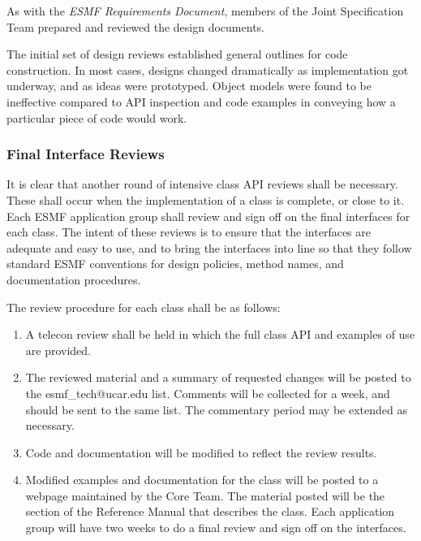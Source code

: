 As with the {\it ESMF Requirements Document}, members of the Joint 
Specification Team prepared and reviewed the design documents. 

The initial set of design reviews established general outlines for 
code construction.  In most cases, designs changed dramatically as
implementation got underway, and as ideas were prototyped.  Object 
models were found to be ineffective compared to API inspection and 
code examples in conveying how a particular piece of code would work.

\subsubsection{Final Interface Reviews}

It is clear that another round of intensive class API reviews
shall be necessary.  These shall occur when the implementation 
of a class is complete, or close to it.  Each ESMF application group 
shall review 
and sign off on the final interfaces for each class.  The intent 
of these reviews is to ensure that the interfaces are adequate 
and easy to use, and to bring the interfaces into line so 
that they follow standard ESMF conventions for design policies, 
method names, and documentation procedures.  

The review procedure for each class shall be as follows:

\begin{enumerate}
\item A telecon review shall be held in which the full class API 
and examples of use are provided.  

\item The reviewed material and a summary of requested changes will
be posted to the esmf\_tech@ucar.edu list.  Comments will be
collected for a week, and should be sent to the same list.
The commentary period may be extended as necessary.

\item Code and documentation will be modified to reflect the review
results.  

\item Modified examples and documentation for the class will be
posted to a webpage maintained by the Core Team.  The material
posted will be the section of the Reference Manual that 
describes the class.  Each application group will have two weeks 
to do a final review and sign off on the interfaces.
 
\end{enumerate}

